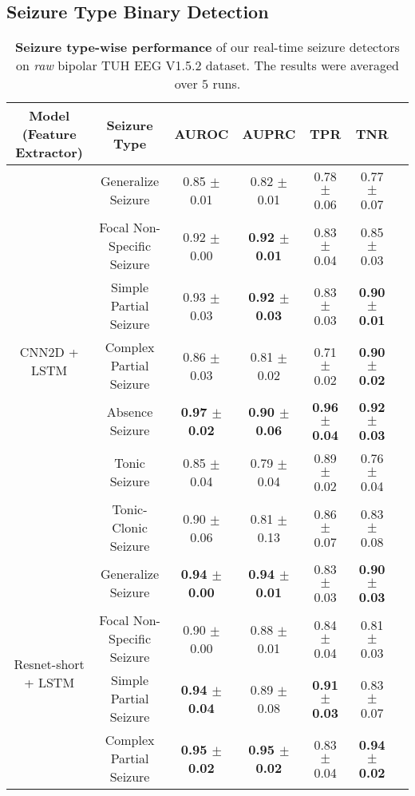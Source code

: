 \documentclass[pmlr,twocolumn,10pt]{jmlr}
\begin{document}
\subsection{Seizure Type Binary Detection}
\begin{table*}[ht!]
	\small
	\centering
	\caption{\textbf{Seizure type-wise performance} of our real-time seizure detectors on \textit{raw} bipolar TUH EEG V1.5.2 dataset. The results were averaged over $5$ runs.}
	\label{seizuretype}
	\begin{tabular}{c|c|ccccc}
		\toprule
		Model (Feature Extractor) &Seizure Type & AUROC & AUPRC & TPR & TNR\\
		\midrule
		\multirow{7}{*}{CNN2D + LSTM}
		&Generalize Seizure 
		& 0.85 $\pm$ 0.01 
		& 0.82 $\pm$ 0.01 
		& 0.78 $\pm$ 0.06 
		& 0.77 $\pm$ 0.07 
		\\
		&Focal Non-Specific Seizure 
		& 0.92 $\pm$ 0.00 
		& \textbf{0.92 $\pm$ 0.01 }
		& 0.83 $\pm$ 0.04 
		& 0.85 $\pm$ 0.03 \\
		&Simple Partial Seizure 
		& 0.93 $\pm$ 0.03 
		& \textbf{0.92 $\pm$ 0.03 }
		& 0.83 $\pm$ 0.03 
		& \textbf{0.90 $\pm$ 0.01 }
		\\
		&Complex Partial Seizure 
		& 0.86 $\pm$ 0.03 
		& 0.81 $\pm$ 0.02 
		& 0.71 $\pm$ 0.02 
		& \textbf{0.90 $\pm$ 0.02 }
		\\
		(Raw) &Absence Seizure 
		& \textbf{0.97 $\pm$ 0.02 }
		& \textbf{0.90 $\pm$ 0.06 }
		& \textbf{0.96 $\pm$ 0.04 }
		& \textbf{0.92 $\pm$ 0.03 }
		\\
		&Tonic Seizure 
		& 0.85 $\pm$ 0.04 
		& 0.79 $\pm$ 0.04
		& 0.89 $\pm$ 0.02 
		& 0.76 $\pm$ 0.04 
		\\
		&Tonic-Clonic Seizure 
		& 0.90 $\pm$ 0.06 
		& 0.81 $\pm$ 0.13 
		& 0.86 $\pm$ 0.07 
		& 0.83 $\pm$ 0.08 
		\\
		\midrule
		\multirow{7}{*}{Resnet-short + LSTM }
		&Generalize Seizure 
		& \textbf{0.94 $\pm$ 0.00} 
		& \textbf{0.94 $\pm$ 0.01} 
		& 0.83 $\pm$ 0.03 
		& \textbf{0.90 $\pm$ 0.03 }
		\\
		&Focal Non-Specific Seizure 
		& 0.90 $\pm$ 0.00 
		& 0.88 $\pm$ 0.01 
		& 0.84 $\pm$ 0.04 
		& 0.81 $\pm$ 0.03 
		\\
		&Simple Partial Seizure 
		&\textbf{0.94 $\pm$ 0.04 }
		& 0.89 $\pm$ 0.08 
		& \textbf{0.91 $\pm$ 0.03 }
		& 0.83 $\pm$ 0.07 
		\\
		&Complex Partial Seizure 
		& \textbf{0.95 $\pm$ 0.02 }
		& \textbf{0.95 $\pm$ 0.02 }
		& 0.83 $\pm$ 0.04 
		& \textbf{0.94 $\pm$ 0.02 }
		\\

\end{tabular}
\end{table*}
\end{document}
